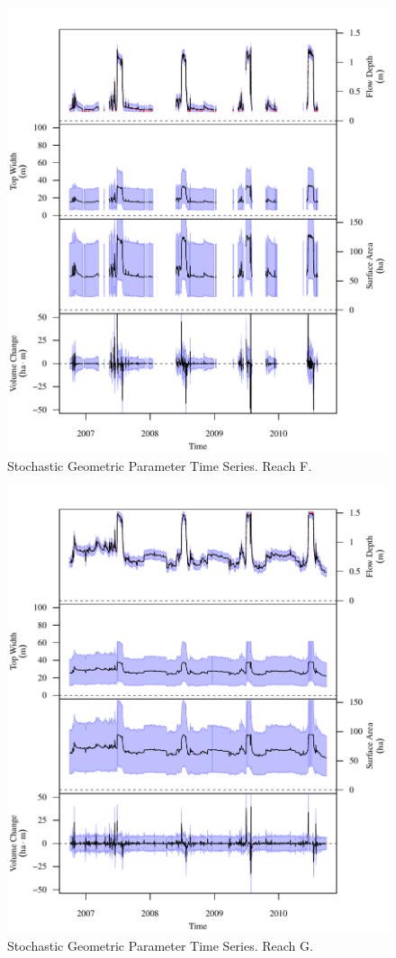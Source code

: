 \begin{figure}[htbp]
\begin{center}
	\includegraphics[width=5.5in]{"Figures/Results_DSR/G TS F"}
	\caption{Stochastic Geometric Parameter Time Series.  Reach F.}
\end{center}
\end{figure}
\newpage

\begin{figure}[htbp]
\begin{center}
	\includegraphics[width=5.5in]{"Figures/Results_DSR/G TS G"}
	\caption{Stochastic Geometric Parameter Time Series.  Reach G.}
\end{center}
\end{figure}
\newpage